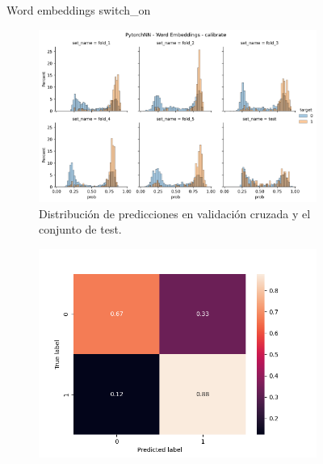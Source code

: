 \begin{figure}
\begin{subfigure}[b]{0.83\textwidth}
    \end{subfigure}
    \caption{Word embeddings switch\_on}
\end{figure}


\begin{figure}
    \begin{subfigure}[b]{\textwidth}
        \centering
        \includegraphics[width=\linewidth]{figures/results/word_embeddings/nn/calibrate/calibrate__distplot.png}
        \caption{Distribución de predicciones en validación cruzada y el conjunto de test.}
        \label{fig:my_label}
    \end{subfigure}
    \hfill
    \begin{subfigure}[b]{\textwidth}
      \includegraphics[width=\linewidth]{figures/results/word_embeddings/nn/calibrate/calibrate_set_1_confusion_matrix_percent.png}

\end{subfigure}
\end{figure}
